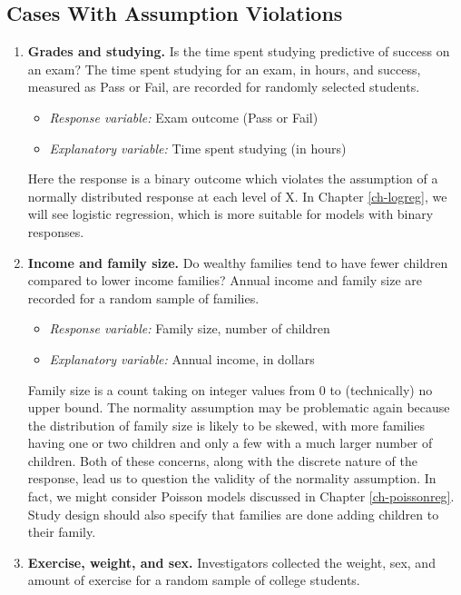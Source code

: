 \documentclass[
]{krantz}
\providecommand{\tightlist}{%
  \setlength{\itemsep}{0pt}\setlength{\parskip}{0pt}}
\begin{document}
\hypertarget{cases-with-assumption-violations}{%
\subsection{Cases With Assumption Violations}\label{cases-with-assumption-violations}}

\begin{enumerate}
\def\labelenumi{\arabic{enumi})}
\item
  \textbf{Grades and studying.} Is the time spent studying predictive of success on an exam? The time spent studying for an exam, in hours, and success, measured as Pass or Fail, are recorded for randomly selected students.

  \begin{itemize}
  \tightlist
  \item
    \emph{Response variable:} Exam outcome (Pass or Fail)
  \item
    \emph{Explanatory variable:} Time spent studying (in hours)
  \end{itemize}

  Here the response is a binary outcome which violates the assumption of a normally distributed response at each level of X. In Chapter \ref{ch-logreg}, we will see logistic regression, which is more suitable for models with binary responses.
\item
  \textbf{Income and family size.} Do wealthy families tend to have fewer children compared to lower income families? Annual income and family size are recorded for a random sample of families.

  \begin{itemize}
  \tightlist
  \item
    \emph{Response variable:} Family size, number of children
  \item
    \emph{Explanatory variable:} Annual income, in dollars
  \end{itemize}

  Family size is a count taking on integer values from 0 to (technically) no upper bound. The normality assumption may be problematic again because the distribution of family size is likely to be skewed, with more families having one or two children and only a few with a much larger number of children. Both of these concerns, along with the discrete nature of the response, lead us to question the validity of the normality assumption. In fact, we might consider Poisson models discussed in Chapter \ref{ch-poissonreg}. Study design should also specify that families are done adding children to their family.
\item
  \textbf{Exercise, weight, and sex.} Investigators collected the weight, sex, and amount of exercise for a random sample of college students.


\end{enumerate}
\end{document}
